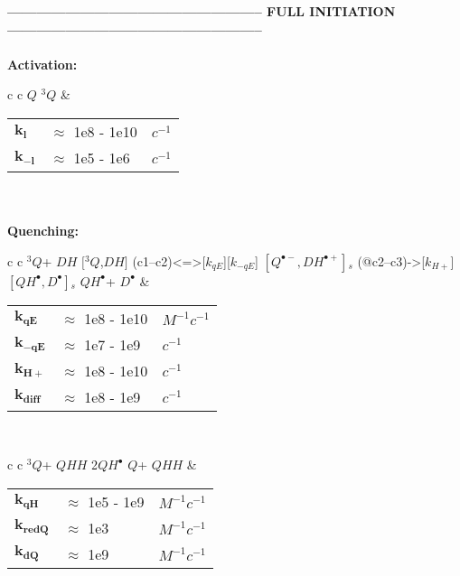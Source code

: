 \documentclass{article}
\def\IRP{$\left[Q^{\bullet -},DH^{\bullet +}\right]{}_s$}
\def\QH{$QH^{\bullet }$}
\def\D{$D^{\bullet }$}
\def\Q{$Q$}
\def\Qt{$^{3}Q$}
\def\DH{$DH$}
\def\QHH{$QHH$}
\begin{document}
\vspace{1.5mm}
\vspace{1.5mm}


\newpage
\textbf{----------------------------------------------------- FULL INITIATION -----------------------------------------------------}
\\
\\
\textbf{Activation:}
\begin{tabular}{ c c }
    \schemestart
    \Q
    \arrow{<=>[$h\nu$, $k_l$][$k_{-l}$]}
    \Qt
    \schemestop
     & \begin{tabular}{ l l l }
           $\mathbf{k_l}$    & $\approx$ 1e8 - 1e10 & $c^{-1}$ \\
           $\mathbf{k_{-l}}$ & $\approx$ 1e5  - 1e6 & $c^{-1}$ \\\hline
       \end{tabular}
    \vspace{1.5mm}
\end{tabular}
\vspace{1.5mm}
\\
\\
\textbf{Quenching:}

\begin{tabular}{ c c }
    \schemestart
    \Qt + \DH
    \arrow{->[$k_{diff}$]}
    $[$\Qt,\DH$]$
    \arrow(c1--c2){<=>[$k_{qE}$][$k_{-qE}$]}
    \IRP
    \arrow(@c2--c3){->[$k_{H+}$]}
    $\left[QH^{\bullet},D^{\bullet}\right]{}_s$
    \arrow{->[$k_{diff}$]}
    \QH + \D
    \schemestop
     & \begin{tabular}{ l l l }
           $\mathbf{k_{qE}}$   & $\approx$ 1e8 - 1e10 & $M^{-1}c^{-1}$ \\
           $\mathbf{k_{-qE}}$  & $\approx$ 1e7 - 1e9  & $c^{-1}$       \\
           $\mathbf{k_{H+}}$   & $\approx$ 1e8 - 1e10 & $c^{-1}$       \\
           $\mathbf{k_{diff}}$ & $\approx$ 1e8 - 1e9  & $c^{-1}$       \\\hline
       \end{tabular}
    \vspace{1.5mm}
    \\
\end{tabular}
\vspace{1.5mm}

\begin{tabular}{ c c }
    \schemestart
    \Qt + \QHH
    \arrow{->[$k_{qH}$]}
    2\QH
    \arrow{<=>[$k_{dQ}$][$k_{redQ}$]}
    \Q + \QHH
    \schemestop
     & \begin{tabular}{ l l l }
           $\mathbf{k_{qH}}$   & $\approx$ 1e5 - 1e9 & $M^{-1}c^{-1}$ \\
           $\mathbf{k_{redQ}}$ & $\approx$ 1e3       & $M^{-1}c^{-1}$ \\
           $\mathbf{k_{dQ}}$   & $\approx$ 1e9       & $M^{-1}c^{-1}$ \\\hline
       \end{tabular}
    \vspace{1.5mm}
\end{tabular}
\vspace{1.5mm}
\end{document}
